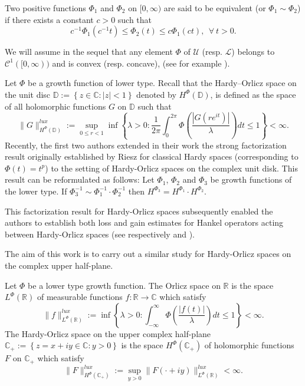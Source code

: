 \documentclass[a4paper,12pt,intlimits,oneside]{amsart}
\theoremstyle{definition}
\numberwithin{equation}{section}
\theoremstyle{definition}
\begin{document}
\medskip

Two positive functions  $\Phi_{1}$ and $\Phi_{2}$ on $[0,\infty)$ are said to be equivalent (or $\Phi_{1} \sim \Phi_{2}$) if there exists a constant $c > 0$ such that
\begin{equation}\label{eq:equivalent}
c^{-1}\Phi_{1}(c^{-1}t) \leq \Phi_{2}(t)\leq c\Phi_{1}(ct), ~~ \forall~ t > 0.\end{equation} 

\medskip

We will assume in the sequel that  any element $\Phi$ of $\mathscr{U}$ (resp. $\mathscr{L}$) belongs to $\mathscr{C}^{1}([0,\infty))$ and is  
convex (resp. concave), 
(see for example \cite{djefeuto1, djesehb,  sehbaedgc}). 

\medskip

Let $\Phi$ be a growth function of lower type. Recall that the Hardy--Orlicz space on the unit disc 
 $\mathbb D := \left\lbrace z \in\mathbb C : \vert z\vert < 1\right\rbrace $ denoted by $H^\Phi(\mathbb D)$, is defined as the space of all holomorphic functions $G$ on $\mathbb{D}$ such that
$$   \|G\|_{H^{\Phi}(\mathbb D)}^{lux}:=\sup_{0\leq r<1}\inf\left\{\lambda>0 :  \frac{1}{2\pi}\int^{2\pi}_0\Phi\left(\frac{|G(re^{it})|}{\lambda}\right)dt \leq 1  \right\}< \infty. $$
Recently, the first two authors extended in their work \cite[Theorem 3]{djefeuto1} the strong factorization result originally established by Riesz for classical Hardy spaces (corresponding to $\Phi(t)=t^p$) to the setting of Hardy-Orlicz spaces on the complex unit disk. This result can be reformulated as follows: Let $\Phi_{1}$,  $\Phi_{2}$ and $\Phi_{3}$ be growth functions of the lower type. If  $\Phi_{3}^{-1} \sim \Phi_{1}^{-1}\cdot\Phi_{2}^{-1}$ then  $H^{\Phi_{3}}=H^{\Phi_{1}}\cdot H^{\Phi_{2}}$. 

This factorization result for Hardy-Orlicz spaces subsequently enabled the authors to establish both loss and gain estimates for Hankel operators acting between Hardy-Orlicz spaces (see respectively \cite[Theorem 4 ]{djefeuto1} and  \cite[Theorem 5 ]{djefeuto1}).

\medskip


The aim of this work is to carry out a similar study for Hardy-Orlicz spaces on the complex upper half-plane.

\medskip

Let  $\Phi$ be a lower type growth function.  The Orlicz space on $\mathbb{R}$ is the space  $L^{\Phi}(\mathbb{R})$ of  measurable functions $f : \mathbb{R} \longrightarrow \mathbb{C}$ which satisfy
$$ \|f\|_{L^{\Phi}(\mathbb{R})}^{lux}:=\inf\left\{\lambda>0 :  \int_{-\infty}^{\infty}\Phi\left(\frac{|f(t)|}{\lambda}\right)dt \leq 1  \right\}< \infty. $$
The Hardy-Orlicz space on  the upper complex half-plane  $\mathbb{C}_{+}:=\left\{ z=x+iy \in \mathbb{C} :   y > 0 \right\}$ is the space  $H^{\Phi}(\mathbb{C}_{+})$ of holomorphic functions $F$ on  $\mathbb{C}_{+}$ 
which satisfy
$$ \|F\|_{H^{\Phi}(\mathbb{C}_{+})}^{lux}:=\sup_{y>0 }\|F(\cdot+iy)\|_{L^{\Phi}(\mathbb{R})}^{lux}< \infty.   $$
\end{document}

